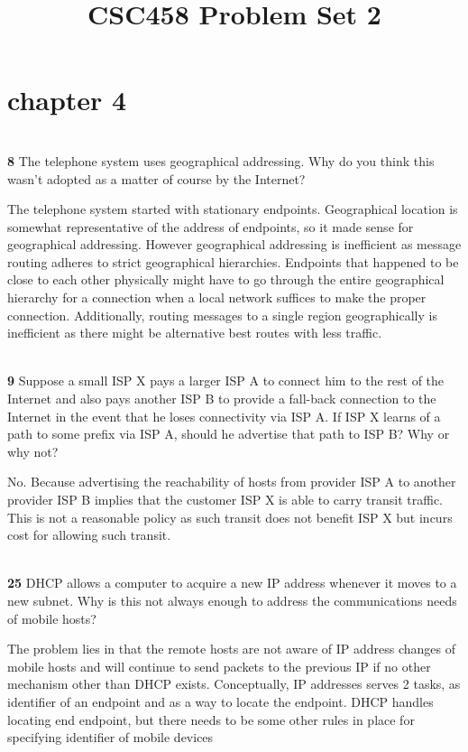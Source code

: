 \documentclass[11pt]{article}
\title{CSC458 Problem Set 2}
\begin{document}
\maketitle




\section*{chapter 4}
$ $\\
\textbf{8} The telephone system uses geographical addressing. Why do you think this wasn’t adopted as a matter of course by the Internet?

\begin{solution}
    The telephone system started with stationary endpoints. Geographical location is somewhat representative of the address of endpoints, so it made sense for geographical addressing. However geographical addressing is inefficient as message routing adheres to strict geographical hierarchies. Endpoints that happened to be close to each other physically might have to go through the entire geographical hierarchy for a connection when a local network suffices to make the proper connection. Additionally, routing messages to a single region geographically is inefficient as there might be alternative best routes with less traffic.
\end{solution}

$ $\\
\textbf{9}  Suppose a small ISP X pays a larger ISP A to connect him to the rest of the Internet and also pays another ISP B to provide a fall-back connection to the Internet in the event that he loses connectivity via ISP A. If ISP X learns of a path to some prefix via ISP A, should he advertise that path to ISP B? Why or why not?


\begin{solution}
    No. Because advertising the reachability of hosts from provider ISP A to another provider ISP B implies that the customer ISP X is able to carry transit traffic. This is not a reasonable policy as such transit does not benefit ISP X but incurs cost for allowing such transit.
\end{solution}

$ $\\
\textbf{25} DHCP allows a computer to acquire a new IP address whenever it moves to a new subnet. Why is this not always enough to address the communications needs of mobile hosts?

\begin{solution}
    The problem lies in that the remote hosts are not aware of IP address changes of mobile hosts and will continue to send packets to the previous IP if no other mechanism other than DHCP exists. Conceptually, IP addresses serves 2 tasks, as identifier of an endpoint and as a way to locate the endpoint. DHCP handles locating end endpoint, but there needs to be some other rules in place for specifying identifier of mobile devices
\end{solution}
\end{document}
